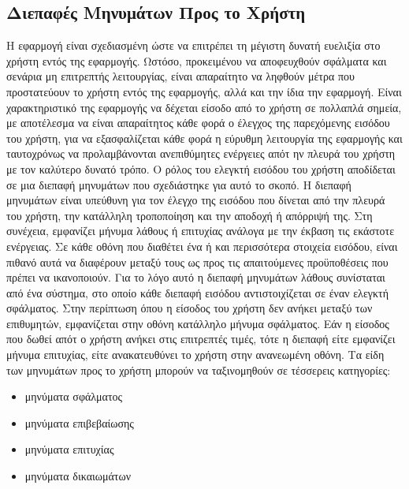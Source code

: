 \subsection{Διεπαφές Μηνυμάτων Προς το Χρήστη}
Η εφαρμογή είναι σχεδιασμένη ώστε να επιτρέπει τη μέγιστη δυνατή ευελιξία στο χρήστη εντός της εφαρμογής. Ωστόσο, προκειμένου να αποφευχθούν σφάλματα και σενάρια μη επιτρεπτής λειτουργίας, είναι απαραίτητο να ληφθούν μέτρα που προστατεύουν το χρήστη εντός της εφαρμογής, αλλά και την ίδια την εφαρμογή. Είναι χαρακτηριστικό της εφαρμογής να δέχεται είσοδο από το χρήστη σε πολλαπλά σημεία, με αποτέλεσμα να είναι απαραίτητος κάθε φορά ο έλεγχος της παρεχόμενης εισόδου του χρήστη, για να εξασφαλίζεται κάθε φορά η εύρυθμη λειτουργία της εφαρμογής και ταυτοχρόνως να προλαμβάνονται ανεπιθύμητες ενέργειες απότ ην πλευρά του χρήστη με τον καλύτερο δυνατό τρόπο.
\newline \indent
Ο ρόλος του ελεγκτή εισόδου του χρήστη αποδίδεται σε μια διεπαφή μηνυμάτων που σχεδιάστηκε για αυτό το σκοπό. Η διεπαφή μηνυμάτων είναι υπεύθυνη για τον έλεγχο της εισόδου που δίνεται από την πλευρά του χρήστη, την κατάλληλη τροποποίηση και την αποδοχή ή απόρριψή της. Στη συνέχεια, εμφανίζει μήνυμα λάθους ή επιτυχίας ανάλογα με την έκβαση τις εκάστοτε ενέργειας. Σε κάθε οθόνη που διαθέτει ένα ή και περισσότερα στοιχεία εισόδου, είναι πιθανό αυτά να διαφέρουν μεταξύ τους ως προς τις απαιτούμενες προϋποθέσεις που πρέπει να ικανοποιούν. Για το λόγο αυτό η διεπαφή μηνυμάτων λάθους συνίσταται από ένα σύστημα, στο οποίο κάθε διεπαφή εισόδου αντιστοιχίζεται σε έναν ελεγκτή σφάλματος. Στην περίπτωση όπου η είσοδος του χρήστη δεν ανήκει μεταξύ των επιθυμητών, εμφανίζεται στην οθόνη κατάλληλο μήνυμα σφάλματος. Εάν η είσοδος που δωθεί απότ ο χρήστη ανήκει στις επιτρεπτές τιμές, τότε η διεπαφή είτε εμφανίζει μήνυμα επιτυχίας, είτε ανακατευθύνει το χρήστη στην ανανεωμένη οθόνη.
\newline \indent
Τα είδη των μηνυμάτων προς το χρήστη μπορούν να ταξινομηθούν σε τέσσερεις κατηγορίες:
\begin{itemize}
    \item μηνύματα σφάλματος
    \item μηνύματα επιβεβαίωσης
    \item μηνύματα επιτυχίας
    \item μηνύματα δικαιωμάτων
\end{itemize}

